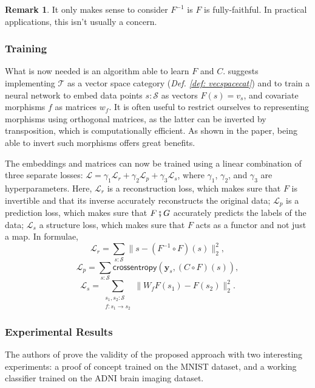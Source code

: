 \documentclass[11pt,a4paper,openright,twoside]{report}
\theoremstyle{plain}
\theoremstyle{definition}
\newtheorem{remark}[proposition]{Remark}
\begin{document}
\begin{remark}
  It only makes sense to consider $F^{-1}$ is $F$ is fully-faithful. In practical applications, this isn't usually a concern.
\end{remark}


\subsubsection{Training}

What is now needed is an algorithm able to learn $F$ and $C$. \cite{chytas2024poolingimagedatasetsmultiple} suggests implementing $\mathcal{T}$ as a vector space category (\textit{Def. \ref{def: vecspacecat}}) and to train a neural network to embed data points $s : \mathcal{S}$ as vectors $F(s) = v_s$, and covariate morphisms $f$ as matrices $w_f$. It is often useful to restrict ourselves to representing morphisms using orthogonal matrices, as the latter can be inverted by transposition, which is computationally efficient. As shown in the paper, being able to invert such morphisms offers great benefits.

The embeddings and matrices can now be trained using a linear combination of three separate losses: $\mathcal{L} = \gamma_1\mathcal{L}_r + \gamma_2\mathcal{L}_p + \gamma_3\mathcal{L}_s$, where $\gamma_1$, $\gamma_2$, and $\gamma_3$ are hyperparameters. Here, $\mathcal{L}_r$ is a reconstruction loss, which makes sure that $F$ is invertible and that its inverse accurately reconstructs the original data; $\mathcal{L}_p$ is a prediction loss, which makes sure that $F \fatsemi G$ accurately predicts the labels of the data; $\mathcal{L}_s$ a structure loss, which makes sure that $F$ acts as a functor and not just a map. In formulae,
\[\mathcal{L}_r = \sum_{s : \mathcal{S}}\|s-(F^{-1} \circ F)(s)\|^2_2,\]
\[\mathcal{L}_p = \sum_{s : \mathcal{S}}\mathsf{crossentropy}(\mathbf{y}_s,(C \circ F)(s)),\]
\[\mathcal{L}_s = \sum_{\begin{smallmatrix}s_1, s_2 : \mathcal{S} \\ f: s_1 \to s_2 \end{smallmatrix}}\|W_fF(s_1)-F(s_2)\|^2_2.\]

\subsubsection{Experimental Results}

The authors of \cite{chytas2024poolingimagedatasetsmultiple} prove the validity of the proposed approach with two interesting experiments: a proof of concept trained on the MNIST dataset, and a working classifier trained on the ADNI brain imaging dataset.
\end{document}
